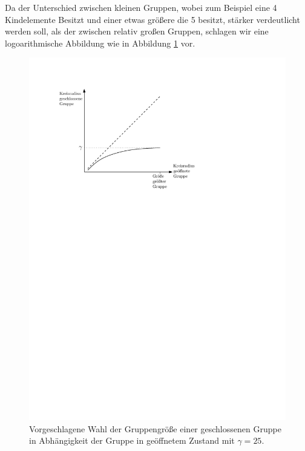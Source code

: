 Da der Unterschied zwischen kleinen Gruppen, wobei zum Beispiel eine 4 Kindelemente Besitzt und einer etwas größere die 5 besitzt, stärker verdeutlicht werden soll, als der zwischen 
relativ großen Gruppen, schlagen wir eine logoarithmische Abbildung wie in Abbildung \ref{f:Radius} vor.
\begin{figure}[h!]
\begin{center} 
\includegraphics{Pics/Radius.pdf}
  \caption{Vorgeschlagene Wahl der Gruppengröße einer geschlossenen Gruppe in Abhängigkeit der Gruppe in geöffnetem Zustand mit $\gamma = 25$. }
  \label{f:Radius}
\end{center}
\end{figure}

